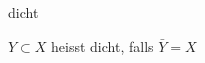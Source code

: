 \documentclass[class=article, crop=false]{standalone}
\begin{document}
\begin{zettel}{dicht}
\begin{flashcard}[]{}
	\begin{definition}[dicht]
		$Y \subset X$ heisst dicht, falls $ \bar{Y} = X$
	\end{definition}
\end{flashcard}
\end{zettel}
\end{document}
